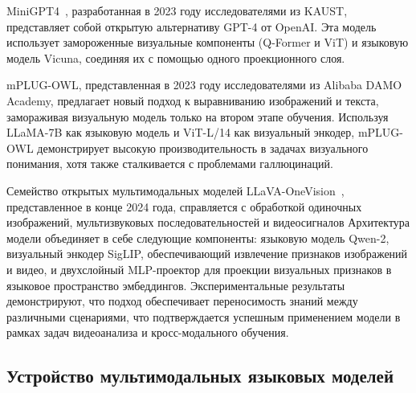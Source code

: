 \documentclass[LI,KR]{HSEUniversity}
\begin{document}
MiniGPT4~\cite{minigpt4}, разработанная в 2023 году исследователями из KAUST, представляет собой открытую альтернативу GPT-4 от OpenAI.
Эта модель использует замороженные визуальные компоненты (Q-Former и ViT) и языковую модель Vicuna, соединяя их с помощью одного проекционного слоя.

mPLUG-OWL\cite{mplugowl}, представленная в 2023 году исследователями из Alibaba DAMO Academy, предлагает новый подход к выравниванию изображений и текста, замораживая визуальную модель только на втором этапе обучения.
Используя LLaMA-7B как языковую модель и ViT-L/14 как визуальный энкодер, mPLUG-OWL демонстрирует высокую производительность в задачах визуального понимания, хотя также сталкивается с проблемами галлюцинаций.

Семейство открытых мультимодальных моделей LLaVA-OneVision~\cite{llavaonevision}, представленное в конце 2024 года, справляется с обработкой одиночных изображений,
мультизвуковых последовательностей и видеосигналов
Архитектура модели объединяет в себе следующие компоненты:
языковую модель Qwen-2,
визуальный энкодер SigLIP, обеспечивающий извлечение признаков изображений и видео,
и двухслойный MLP-проектор для проекции визуальных признаков в языковое пространство эмбеддингов.
Экспериментальные результаты демонстрируют, что подход обеспечивает переносимость знаний между различными сценариями, что подтверждается успешным применением модели в рамках задач видеоанализа и кросс-модального обучения.

\subsection*{Устройство мультимодальных языковых моделей}
\end{document}
